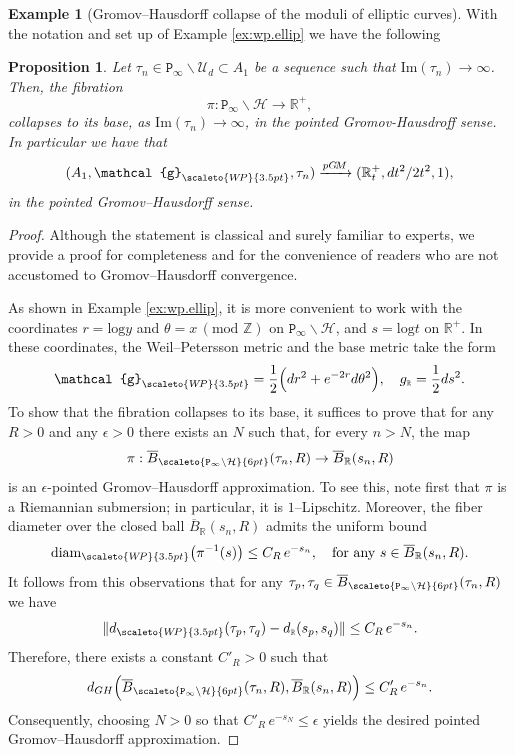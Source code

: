 \documentclass[11pt]{amsart}
\theoremstyle{plain}
\newtheorem{proposition}[theorem]{Proposition}
\theoremstyle{definition}
\newtheorem{example}[theorem]{Example}
\theoremstyle{remark}
\newcommand{\R}{\mathbb R}
\newcommand{\Z}{\mathbb{Z}}
\renewcommand{\log}{\mathrm{log}}
\newcommand{\im}{\mathrm{Im}}
\newcommand{\g}{\mathcal{g}}
\newcommand{\cH}{\mathcal{H}}
\newcommand{\tP}{\mathtt{P}}
\newcommand{\diam}{\mathrm{diam}}
\newcommand{\WP}{\scaleto{W\!P}{3.5pt}}
\begin{document}
\begin{example}[Gromov--Hausdorff collapse of the moduli of elliptic curves]\hfill \break
    \newline With the notation and set up of Example \ref{ex:wp.ellip} we have the following
    \begin{proposition}
        Let $\tau_n \in \tP_\infty\backslash\mathcal{U}_d \subset A_1$ be a sequence such that $\im(\tau_n)\to \infty$. Then,
        the fibration
        \begin{equation}
            \pi:\tP_\infty\backslash\cH\to \R^+,
        \end{equation}
        collapses to its base, as $\im(\tau_n)\to \infty$, in the pointed Gromov-Hausdroff sense. In particular we have that 
        \begin{equation}
        \label{eq:pGH.conv.A1}
            (A_1, \g_{\WP}, \tau_n) \xrightarrow[]{pG\!M} (\R^{+}_t, dt^2/2t^2,1),
        \end{equation}
        in the pointed Gromov--Hausdorff sense. 
    \end{proposition}
    \begin{proof}
    Although the statement is classical and surely familiar to experts, we provide a proof for completeness and for the convenience of readers who are not accustomed to Gromov--Hausdorff convergence.
    
    As shown in Example \ref{ex:wp.ellip}, it is more convenient to work with the coordinates
    $r=\log y$ and $\theta=x \,(\text{mod }\Z)$ on $\tP_\infty\backslash\cH$, and $s=\log t$ on $\R^{+}$.
    In these coordinates, the Weil--Petersson metric and the base metric take the form
    \[
    \g_{\WP}=\frac{1}{2}\Bigl( dr^2+ e^{-2r}d\theta^2\Bigr), \quad g_{\scriptscriptstyle{\R}}=\frac{1}{2}ds^2.
    \]
    To show that the fibration collapses to its base, it suffices to prove that for any $R>0$ and any $\epsilon>0$
    there exists an $N$ such that, for every $n>N$, the map
    \[
    \pi:\overline B_{\scaleto{\tP_\infty\backslash\cH}{6pt}}(\tau_n,R)\to \overline B_{\R}(s_n,R)
    \]
    is an $\epsilon$-pointed Gromov--Hausdorff approximation. To see this, note first that $\pi$ is a Riemannian
    submersion; in particular, it is $1$--Lipschitz. Moreover, the fiber diameter over the closed ball
    $\overline B_\R(s_n,R)$ admits the uniform bound
    \[
    \diam_{\WP}\bigl(\pi^{-1}(s)\bigr)\leq C_R \,e^{-s_n}, \quad \text{for any } s\in \overline B_{\R}(s_n,R).
    \]
    It follows from this observations that for any $\tau_p,\tau_q \in \overline B_{\scaleto{\tP_\infty\backslash\cH}{6pt}}(\tau_n,R)$ we have
    \[
    \|d_{\WP}(\tau_p,\tau_q)- d_{\scriptscriptstyle{\R}}(s_p,s_q)\|\leq C_R\,e^{-s_n}.
    \]
    Therefore, there exists a constant $C'_R>0$ such that
    \[
    d_{GH}\Bigl(\overline B_{\scaleto{\tP_\infty\backslash\cH}{6pt}}(\tau_n,R),\overline B_{\R}(s_n,R)\Bigr)\leq C'_R\,e^{-s_n}.
    \]
    Consequently, choosing $N>0$ so that $C'_R\,e^{-s_N}\leq \epsilon$ yields the desired pointed
    Gromov--Hausdorff approximation.
    

\end{proof}
\end{example}
\end{document}
